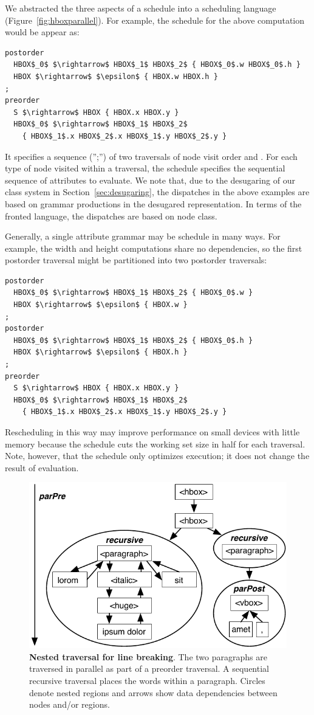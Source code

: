 We abstracted the three aspects of a schedule into a scheduling language (Figure~\ref{fig:hboxparallel}). For example, the schedule for the above computation would be appear as:
\begin{lstlisting}[mathescape,morekeywords={preorder,postorder}]
postorder
  HBOX$_0$ $\rightarrow$ HBOX$_1$ HBOX$_2$ { HBOX$_0$.w HBOX$_0$.h }
  HBOX $\rightarrow$ $\epsilon$ { HBOX.w HBOX.h }
;
preorder
  S $\rightarrow$ HBOX { HBOX.x HBOX.y }
  HBOX$_0$ $\rightarrow$ HBOX$_1$ HBOX$_2$ 
    { HBOX$_1$.x HBOX$_2$.x HBOX$_1$.y HBOX$_2$.y }
\end{lstlisting}
It specifies a sequence ('';'') of two traversals of node visit order  and . For each type of node visited within a traversal, the schedule specifies the sequential sequence of attributes to evaluate. We note that, due to the desugaring of our class system in Section~\ref{sec:desugaring}, the dispatches in the above examples are based on grammar productions in the desugared representation. In terms of the fronted language, the dispatches are based on node class.


Generally, a single attribute grammar may be schedule in many ways. For example, the width and height computations share no dependencies, so the first postorder traversal might be partitioned into two postorder traversals:
\begin{lstlisting}[mathescape,morekeywords={preorder,postorder}]
postorder
  HBOX$_0$ $\rightarrow$ HBOX$_1$ HBOX$_2$ { HBOX$_0$.w }
  HBOX $\rightarrow$ $\epsilon$ { HBOX.w }
;
postorder
  HBOX$_0$ $\rightarrow$ HBOX$_1$ HBOX$_2$ { HBOX$_0$.h }
  HBOX $\rightarrow$ $\epsilon$ { HBOX.h }
;
preorder
  S $\rightarrow$ HBOX { HBOX.x HBOX.y }
  HBOX$_0$ $\rightarrow$ HBOX$_1$ HBOX$_2$ 
    { HBOX$_1$.x HBOX$_2$.x HBOX$_1$.y HBOX$_2$.y }
\end{lstlisting}
Rescheduling in this way may improve performance on small devices with little memory because the schedule cuts the working set size in half for each traversal. Note, however, that the schedule only optimizes execution; it does not change the result of evaluation.


\begin{figure}
\centering
\includegraphics[trim=0 0 0 0,clip,width=0.7\columnwidth]{chapter3/nested}
\caption{\textbf{Nested traversal for line breaking}. The two paragraphs are traversed in parallel as part of a preorder traversal. A sequential recursive traversal places the words within a paragraph. Circles denote nested regions and arrows show data dependencies between nodes and/or regions.}
\label{fig:nested}
\end{figure}

